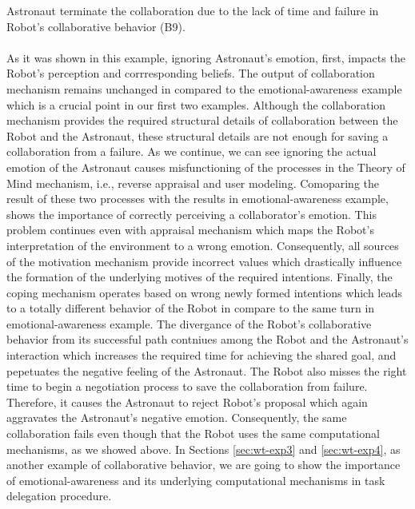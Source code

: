 Astronaut terminate the collaboration due to the lack of time and failure in
Robot's collaborative behavior (B9).\\

\noindent{}\\

As it was shown in this example, ignoring Astronaut's emotion, first, impacts
the Robot's perception and corrresponding beliefs. The output of collaboration
mechanism remains unchanged in compared to the emotional-awareness example which
is a crucial point in our first two examples. Although the collaboration
mechanism provides the required structural details of collaboration between the
Robot and the Astronaut, these structural details are not enough for saving a
collaboration from a failure. As we continue, we can see ignoring the actual
emotion of the Astronaut causes misfunctioning of the processes in the Theory of
Mind mechanism, i.e., reverse appraisal and user modeling. Comoparing the result
of these two processes with the results in emotional-awareness example, shows
the importance of correctly perceiving a collaborator's emotion. This problem
continues even with appraisal mechanism which maps the Robot's interpretation of
the environment to a wrong emotion. Consequently, all sources of the motivation
mechanism provide incorrect values which drastically influence the formation of
the underlying motives of the required intentions. Finally, the coping mechanism
operates based on wrong newly formed intentions which leads to a totally
different behavior of the Robot in compare to the same turn in
emotional-awareness example. The divergance of the Robot's collaborative
behavior from its successful path contniues among the Robot and the Astronaut's
interaction which increases the required time for achieving the shared goal, and
pepetuates the negative feeling of the Astronaut. The Robot also misses the
right time to begin a negotiation process to save the collaboration from
failure. Therefore, it causes the Astronaut to reject Robot's proposal which
again aggravates the Astronaut's negative emotion. Consequently, the same
collaboration fails even though that the Robot uses the same computational
mechanisms, as we showed above. In Sections \ref{sec:wt-exp3} and
\ref{sec:wt-exp4}, as another example of collaborative behavior, we are going to
show the importance of emotional-awareness and its underlying computational
mechanisms in task delegation procedure.

